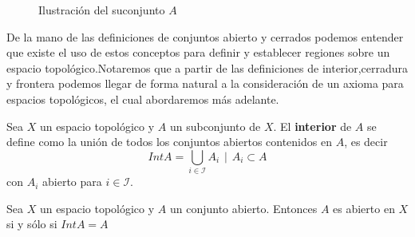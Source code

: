 \begin{figure}[H]
    \centering
    \label{fig:cerrado}
    \caption{Ilustración del suconjunto $A$}
    
\end{figure}

De la mano de las definiciones de conjuntos abierto y cerrados podemos entender que existe el uso de estos conceptos para definir y establecer regiones sobre un espacio topológico.Notaremos que a partir de las definiciones de interior,cerradura y frontera podemos llegar de forma natural a la consideración de un axioma para espacios topológicos, el cual abordaremos más adelante.

\begin{definition}
    Sea $X$ un espacio topológico y $A$ un subconjunto de $X$.
    El \textbf{interior} de $A$ se define como la unión de todos los conjuntos abiertos contenidos en $A$, es decir \[
    Int A = \displaystyle \bigcup_{i \in \mathcal{I}} A_i \hspace{5pt} | \hspace{5pt} A_i \subset A\] con $A_i$ abierto para $i \in \mathcal{I}$.   
\end{definition}

\begin{proposition}
    Sea $X$ un espacio topológico y $A$ un conjunto abierto.
    Entonces $A$ es abierto en $X$ si y sólo si $IntA = A$
\end{proposition}

